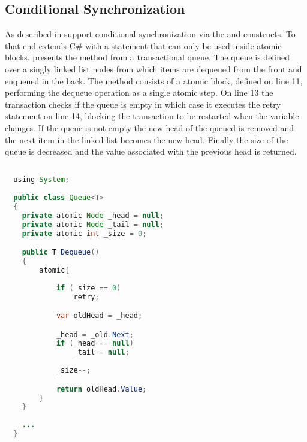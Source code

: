 \subsection{Conditional Synchronization}
As described in  \stmnamesp support conditional synchronization via the  and  constructs. To that end \stmnamesp extends C\# with a  statement that can only be used inside atomic blocks.  presents the  method from a transactional queue. The queue is defined over a singly linked list nodes from which items are dequeued from the front and enqueued in the back. The  method consists of a atomic block, defined on line 11, performing the dequeue operation as a single atomic step. On line 13 the transaction checks if the queue is empty in which case it executes the retry statement on line 14, blocking the transaction to be restarted when the  variable changes. If the queue is not empty the new head of the queued is removed and the next item in the linked list becomes the new head. Finally the size of the queue is decreased and the value associated with the previous head is returned. 

\begin{lstlisting}[label=lst:stm_atomic_syntax_retry,
  caption={Retry Syntax},
  language=Java,  
  showspaces=false,
  showtabs=false,
  breaklines=true,
  showstringspaces=false,
  breakatwhitespace=true,
  commentstyle=\color{greencomments},
  keywordstyle=\color{bluekeywords},
  stringstyle=\color{redstrings},
  morekeywords={atomic, retry, orElse, var, get, set, using}]  % Start your code-block

  using System;
  
  public class Queue<T>
  {
  	private atomic Node _head = null;
  	private atomic Node _tail = null;
  	private atomic int _size = 0;

  	public T Dequeue()
  	{
  		atomic{
  		
  			if (_size == 0)
  				retry;

  			var oldHead = _head;

  			_head = _old.Next;
  			if (_head == null)
  				_tail = null;
  			
  			_size--;

  			return oldHead.Value;
  		}
  	}
  	
  	...
  }
\end{lstlisting}

